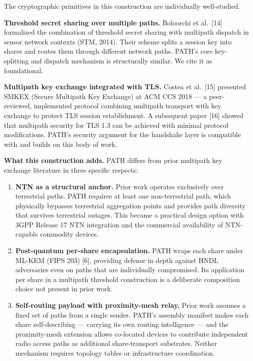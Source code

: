 \documentclass[
  11pt,
]{article}
\providecommand{\tightlist}{%
  \setlength{\itemsep}{0pt}\setlength{\parskip}{0pt}}
\begin{document}
The cryptographic primitives in this construction are individually
well-studied.

\textbf{Threshold secret sharing over multiple paths.} Boloorchi et
al.~{[}14{]} formalized the combination of threshold secret sharing with
multipath dispatch in sensor network contexts (STM, 2014). Their scheme
splits a session key into shares and routes them through different
network paths. PATH's core key-splitting and dispatch mechanism is
structurally similar. We cite it as foundational.

\textbf{Multipath key exchange integrated with TLS.} Costea et
al.~{[}15{]} presented SMKEX (Secure Multipath Key Exchange) at ACM CCS
2018 --- a peer-reviewed, implemented protocol combining multipath
transport with key exchange to protect TLS session establishment. A
subsequent paper {[}16{]} showed that multipath security for TLS 1.3 can
be achieved with minimal protocol modifications. PATH's security
argument for the handshake layer is compatible with and builds on this
body of work.

\textbf{What this construction adds.} PATH differs from prior multipath
key exchange literature in three specific respects:

\begin{enumerate}
\def\labelenumi{\arabic{enumi}.}
\tightlist
\item
  \textbf{NTN as a structural anchor.} Prior work operates exclusively
  over terrestrial paths. PATH requires at least one non-terrestrial
  path, which physically bypasses terrestrial aggregation points and
  provides path diversity that survives terrestrial outages. This became
  a practical design option with 3GPP Release 17 NTN integration and the
  commercial availability of NTN-capable commodity devices.
\item
  \textbf{Post-quantum per-share encapsulation.} PATH wraps each share
  under ML-KEM (FIPS 203) {[}6{]}, providing defense in depth against
  HNDL adversaries even on paths that are individually compromised. Its
  application per share in a multipath threshold construction is a
  deliberate composition choice not present in prior work.
\item
  \textbf{Self-routing payload with proximity-mesh relay.} Prior work
  assumes a fixed set of paths from a single sender. PATH's assembly
  manifest makes each share self-describing --- carrying its own routing
  intelligence --- and the proximity-mesh extension allows co-located
  devices to contribute independent radio access paths as additional
  share-transport substrates. Neither mechanism requires topology tables
  or infrastructure coordination.
\end{enumerate}
\end{document}
